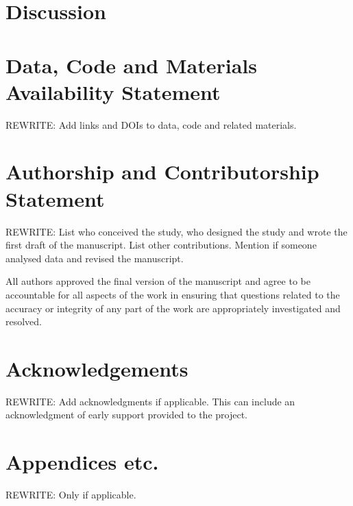 \documentclass{ldr-article}
\begin{document}
\section{Discussion}


\printbibliography

\section{Data, Code and Materials Availability Statement}

\alert{REWRITE:} Add links and DOIs to data, code and related materials.

\section{Authorship and Contributorship Statement}

\alert{REWRITE:} List who conceived the study, who designed the study and wrote the first draft of the manuscript. List other contributions. Mention if someone analysed data and revised the manuscript.

All authors approved the final version of the manuscript and agree to be accountable for all aspects of the work in ensuring that questions related to the accuracy or integrity of any part of the work are appropriately investigated and resolved.

\section{Acknowledgements}

\alert{REWRITE:} Add acknowledgments if applicable. This can include an acknowledgment of early support provided to the project.

\clearpage
\appendix

\section{Appendices etc.}

\alert{REWRITE:} Only if applicable.
\end{document}
